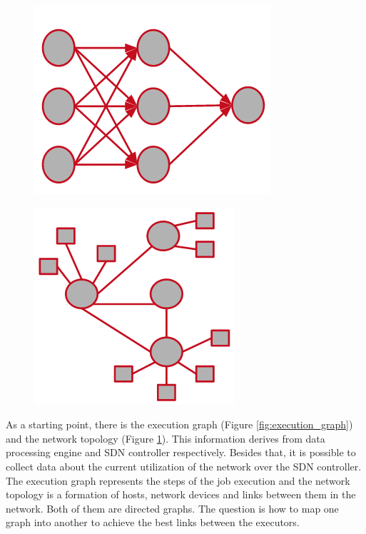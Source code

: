 \begin{figure}[h]
    \centering
    \begin{minipage}{0.5\textwidth}
        \centering
        \includegraphics[width=0.6\linewidth]{graphics/executiongraph.png}
        \label{fig:execution_graph}
    \end{minipage}%
    \begin{minipage}{0.5\textwidth}
        \centering
        \includegraphics[width=0.6\linewidth]{graphics/topology.png}
        \label{fig:network_topology}
    \end{minipage}
\end{figure}

As a starting point, there is the execution graph (Figure \ref{fig:execution_graph}) and the network
topology (Figure \ref{fig:network_topology}).  This information derives from data processing engine
and SDN controller respectively. Besides that, it is possible to collect data about the current
utilization of the network over the SDN controller.  The execution graph represents the steps of the
job execution and the network topology is a formation of hosts, network devices and links between
them in the network. Both of them are directed graphs. The question is how to map one graph
into another to achieve the best links between the executors.

